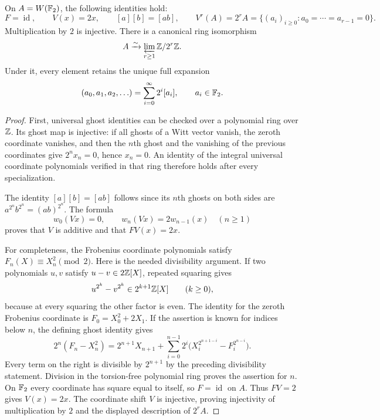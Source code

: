 \begin{lemma}\label{BLR-lem:witt-identities}
On $A=W(\mathbb F_2)$, the following identities hold:
\[
 F=\operatorname{id},\qquad V(x)=2x,\qquad
 [a][b]=[ab],\qquad
 V^r(A)=2^rA=\{(a_i)_{i\geq0}:a_0=\cdots=a_{r-1}=0\}.
\]
Multiplication by $2$ is injective. There is a canonical ring isomorphism
\begin{equation}\label{BLR-eq:coefficient-limit}
 A\xrightarrow{\sim}\varprojlim_{r\geq1}\mathbb Z/2^r\mathbb Z.
\end{equation}
Under it, every element retains the unique full expansion
\begin{equation}\label{BLR-eq:binary-expansion}
 (a_0,a_1,a_2,\ldots)=\sum_{i=0}^{\infty}2^i[a_i],
 \qquad a_i\in\mathbb F_2.
\end{equation}
\end{lemma}
\begin{proof}
First, universal ghost identities can be checked over a polynomial ring
over $\mathbb Z$. Its ghost map is injective: if all ghosts of a Witt vector
vanish, the zeroth coordinate vanishes, and then the $n$th ghost and the
vanishing of the previous coordinates give $2^n x_n=0$, hence $x_n=0$.
An identity of the integral universal coordinate polynomials verified in
that ring therefore holds after every specialization.

The identity $[a][b]=[ab]$ follows since its $n$th ghosts on both sides are
$a^{2^n}b^{2^n}=(ab)^{2^n}$. The formula
\[
 w_0(Vx)=0,\qquad w_n(Vx)=2w_{n-1}(x)\quad(n\geq1)
\]
proves that $V$ is additive and that $FV(x)=2x$.

For completeness, the Frobenius coordinate polynomials satisfy
$F_n(X)\equiv X_n^2\pmod 2$. Here is the needed divisibility argument.
If two polynomials $u,v$ satisfy $u-v\in2\mathbb Z[X]$, repeated squaring gives
\[
 u^{2^k}-v^{2^k}\in2^{k+1}\mathbb Z[X]\qquad(k\geq0),
\]
because at every squaring the other factor is even. The identity for the
zeroth Frobenius coordinate is $F_0=X_0^2+2X_1$. If the assertion is known
for indices below $n$, the defining ghost identity gives
\[
 2^n(F_n-X_n^2)=2^{n+1}X_{n+1}
 +\sum_{i=0}^{n-1}2^i
   \bigl(X_i^{2^{n+1-i}}-F_i^{2^{n-i}}\bigr).
\]
Every term on the right is divisible by $2^{n+1}$ by the preceding
divisibility statement. Division in the torsion-free polynomial ring
proves the assertion for $n$. On $\mathbb F_2$ every coordinate has square
equal to itself, so $F=\operatorname{id}$ on $A$. Thus $FV=2$ gives
$V(x)=2x$. The coordinate shift $V$ is injective, proving injectivity of
multiplication by $2$ and the displayed description of $2^rA$.


\end{proof}
